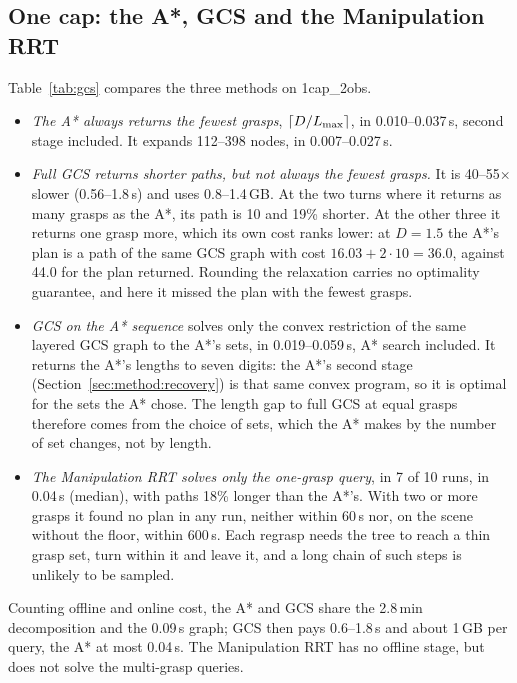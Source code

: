 \subsection{One cap: the A*, GCS and the Manipulation RRT}
\label{sec:results:gcs}
Table~\ref{tab:gcs} compares the three methods on \textsf{1cap\_2obs}.
\begin{itemize}
  \item \emph{The A* always returns the fewest grasps}, $\lceil D/L_{\max}\rceil$,
    in 0.010--0.037\,s, second stage included. It expands 112--398 nodes, in
    0.007--0.027\,s.
  \item \emph{Full GCS returns shorter paths, but not always the fewest
    grasps.} It is 40--55$\times$ slower (0.56--1.8\,s) and uses 0.8--1.4\,GB.
    At the two turns where it returns as many grasps as the A*, its path is 10
    and 19\% shorter. At the other three it returns one grasp more, which its
    own cost ranks lower: at $D=1.5$ the A*'s plan is a path of the same GCS
    graph with cost $16.03+2\cdot10=36.0$, against 44.0 for the plan returned.
    Rounding the relaxation carries no optimality guarantee, and here it missed
    the plan with the fewest grasps.
  \item \emph{GCS on the A* sequence} solves only the convex restriction of
    the same layered GCS graph to the A*'s sets, in 0.019--0.059\,s, A*
    search included. It returns the A*'s lengths to seven digits: the A*'s
    second stage (Section~\ref{sec:method:recovery}) is that same convex
    program, so it is optimal for the sets the A* chose. The length gap to
    full GCS at equal grasps therefore comes from the choice of sets, which
    the A* makes by the number of set changes, not by length.
  \item \emph{The Manipulation RRT solves only the one-grasp query}, in 7 of
    10 runs, in 0.04\,s (median), with paths 18\% longer than the A*'s. With
    two or more grasps it found no plan in any run, neither within 60\,s nor,
    on the scene without the floor, within 600\,s. Each regrasp needs the
    tree to reach a thin grasp set, turn within it and leave it, and a long
    chain of such steps is unlikely to be sampled.
\end{itemize}
Counting offline and online cost, the A* and GCS share the 2.8\,min
decomposition and the 0.09\,s graph; GCS then pays 0.6--1.8\,s and about
1\,GB per query, the A* at most 0.04\,s. The Manipulation RRT has no offline
stage, but does not solve the multi-grasp queries.


